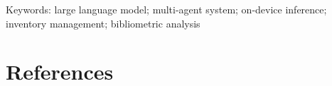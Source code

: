 \documentclass[12pt,a4paper]{article}
\begin{document}
Keywords: large language model; multi-agent system; on-device inference;
inventory management; bibliometric analysis







\clearpage
\section*{References}
\printbibliography[heading=none]
\end{document}

